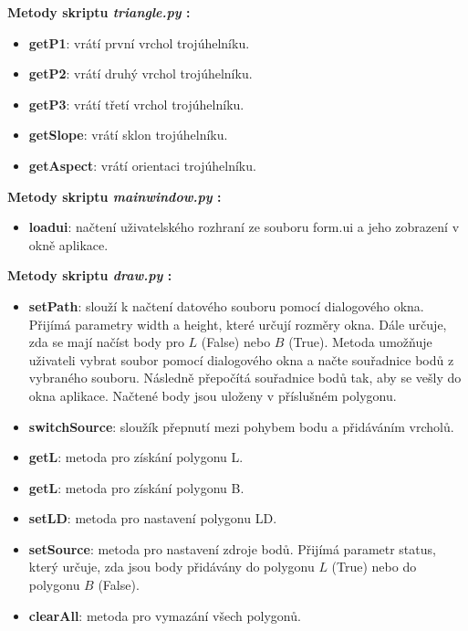 \documentclass[a4paper,12pt]{article}
\begin{document}
{{{{{{    \textbf{Metody skriptu \emph{triangle.py} :}
    \begin{itemize}
    \item \textbf{getP1}: vrátí první vrchol trojúhelníku.
    \item \textbf{getP2}: vrátí druhý vrchol trojúhelníku.
    \item \textbf{getP3}: vrátí třetí vrchol trojúhelníku.
    \item \textbf{getSlope}: vrátí sklon trojúhelníku.
    \item \textbf{getAspect}: vrátí orientaci trojúhelníku.
    \end{itemize}

    \textbf{Metody skriptu \emph{mainwindow.py} :}
    \begin{itemize}
    \item \textbf{loadui}: načtení uživatelského rozhraní ze souboru form.ui a jeho zobrazení v okně aplikace.
    \end{itemize}

    \textbf{Metody skriptu \emph{draw.py} :}
    \begin{itemize}
    \item \textbf{setPath}:  slouží k načtení datového souboru pomocí dialogového okna. Přijímá parametry width a height, které určují rozměry okna. Dále určuje, zda se mají načíst body pro $L$ (False) nebo $B$ (True). Metoda umožňuje uživateli vybrat soubor pomocí dialogového okna a načte souřadnice bodů z vybraného souboru. Následně přepočítá souřadnice bodů tak, aby se vešly do okna aplikace. Načtené body jsou uloženy v příslušném polygonu.

    \item \textbf{switchSource}: sloužík přepnutí mezi pohybem bodu a přidáváním vrcholů.

    \item \textbf{getL}: metoda pro získání polygonu L.

    \item \textbf{getL}: metoda pro získání polygonu B. 

    \item \textbf{setLD}: metoda pro nastavení polygonu LD.

    \item \textbf{setSource}: metoda pro nastavení zdroje bodů. Přijímá parametr status, který určuje, zda jsou body přidávány do polygonu $L$ (True) nebo do polygonu $B$ (False). 
    
    \item \textbf{clearAll}: metoda pro vymazání všech polygonů. 
    


\end{itemize}}}}}}}
\end{document}
